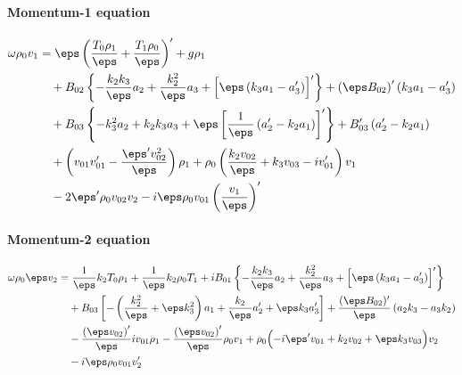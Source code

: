 \paragraph{Momentum-1 equation}
\begin{equation}
  \begin{aligned}
  \omega\rho_0 v_1  &=
    \eps\left(\frac{T_0 \rho_1}{\eps} + \frac{T_1 \rho_0}{\eps}\right)'
    + g \rho_1 \\
    &\quad
		+ B_{02} \left\{
      - \frac{k_2 k_3}{\eps}a_2 + \frac{k_2^2}{\eps}a_3 + \Bigl[\eps\left(k_3a_1 - a_3'\right)\Bigr]'
    \right\}
    + \left(\eps B_{02}\right)'\left(k_3a_1 - a_3'\right)  \\
    &\quad
    + B_{03} \left\{
      -k_3^2 a_2 + k_2 k_3a_3 + \eps\left[\frac{1}{\eps}\left(a_2' - k_2 a_1 \right)\right]'
    \right\}
    + B_{03}' \left(a_2' - k_2a_1\right) \\
    &\quad
    + \left(v_{01} v_{01}' - \frac{\eps' v_{02}^2}{\eps}\right)\rho_1
		+ \rho_0 \left(\frac{k_2 v_{02}}{\eps} + k_3 v_{03} - i v_{01}'\right)v_1 \\
    &\quad
		- 2 \eps' \rho_0 v_{02} v_2
    - i\eps\rho_0 v_{01} \left(\frac{v_1}{\eps}\right)'
  \end{aligned}
\end{equation}

\paragraph{Momentum-2 equation}
\begin{equation}
  \begin{aligned}
  \omega\rho_0 \eps v_2 &=
    \frac{1}{\eps} k_2 T_0 \rho_1
    + \frac{1}{\eps}k_2 \rho_0 T_1
    + i B_{01} \left\{
      -\frac{k_2 k_3}{\eps}a_2  + \frac{k_2^2}{\eps}a_3 + \Bigl[\eps\left(k_3 a_1  - a_3'\right)\Bigr]'
    \right\} \\
    &\quad
    + B_{03} \left[- \left(\frac{k_2^2}{\eps} + \eps k_3^2\right)a_1  + \frac{ k_2}{\eps}a_2' +  \eps k_3a_3'\right]
    + \frac{(\eps B_{02})'}{\eps}\left(a_2 k_3 - a_3 k_2\right) \\
    &\quad
    - \frac{\left(\eps v_{02}\right)'}{\eps} i v_{01} \rho_1
    - \frac{\left(\eps v_{02}\right)'}{\eps}\rho_0 v_1
    + \rho_0 \Bigl(- i \eps' v_{01} + k_2 v_{02} + \eps k_3 v_{03}\Bigr)v_2 \\
    &\quad
    - i \eps \rho_0 v_{01} v_2'
  \end{aligned}
\end{equation}

